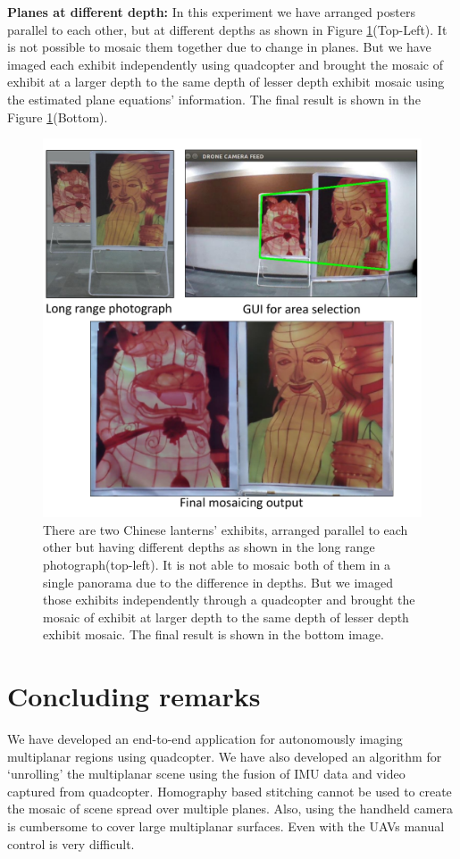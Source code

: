 \textbf{Planes at different depth:} In this experiment we have arranged posters
parallel to each other, but at different depths as shown in Figure
\ref{fig:resultFrontBack}(Top-Left). It is not possible to mosaic them together
due to change in planes. But we have imaged each exhibit independently using
quadcopter and brought the mosaic of exhibit at a larger depth to the same depth
of lesser depth exhibit mosaic using the estimated plane equations' information.
The final result is shown in the Figure \ref{fig:resultFrontBack}(Bottom).
\begin{figure}
\centering
\includegraphics[width=\linewidth]{figures/multiplanar/frontback.pdf}
\caption[Result: Imaging at different depths]{There are two Chinese lanterns'
exhibits, arranged parallel to each other but having different depths as shown in the long range
photograph(top-left). It is not able to mosaic both of them in a single
panorama due to the difference in depths. But we imaged those exhibits
independently through a quadcopter and brought the mosaic of exhibit at larger
depth to the same depth of lesser depth exhibit mosaic. The final result is
shown in the bottom image.}
\label{fig:resultFrontBack}
\end{figure}

\section{Concluding remarks}
We have developed an end-to-end application for autonomously imaging multiplanar
regions using quadcopter. We have also developed an algorithm for `unrolling'
the multiplanar scene using the fusion of IMU data and video captured from
quadcopter. Homography based stitching cannot be used to create the mosaic of
scene spread over multiple planes. Also, using the handheld camera is cumbersome
to cover large multiplanar surfaces. Even with the UAVs manual control is very difficult.

